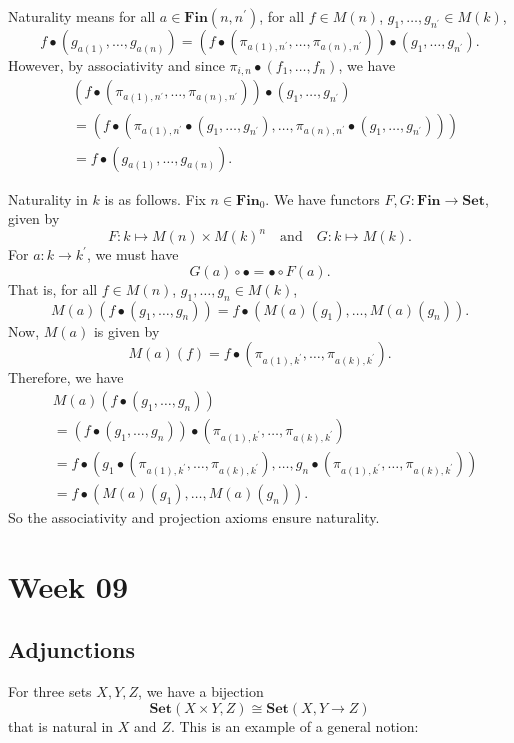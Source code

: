 \documentclass{amsbook}
\newcommand{\Catb}[1]{\mathbf{#1}}
\newcommand{\SET}{\Catb{Set}}
\newcommand{\FIN}{\Catb{Fin}}
\newcommand{\Ob}[1]{{#1}_0}
\newcommand{\Hom}[3]{{#1}\left(#2,#3\right)}
\theoremstyle{definition}
\begin{document}
  Naturality means for all $ a \in \Hom{\FIN}{n}{n^\prime} $, for all $ f \in M(n) $, $ g_1, \dots, g_{n^\prime} \in M(k) $,
  \[ f \bullet (g_{a(1)}, \dots, g_{a(n)}) = (f \bullet (\pi_{a(1), n^\prime}, \dots, \pi_{a(n), n^\prime})) \bullet (g_1, \dots, g_{n^\prime}). \]
  However, by associativity and since $ \pi_{i, n} \bullet (f_1, \dots, f_n) $, we have
  \begin{align*}
    & (f \bullet (\pi_{a(1), n^\prime}, \dots, \pi_{a(n), n^\prime})) \bullet (g_1, \dots, g_{n^\prime})\\
    &= (f \bullet (\pi_{a(1), n^\prime} \bullet (g_1, \dots, g_{n^\prime}), \dots, \pi_{a(n), n^\prime} \bullet (g_1, \dots, g_{n^\prime})))\\
    &= f \bullet (g_{a(1)}, \dots, g_{a(n)}).
  \end{align*}

  Naturality in $ k $ is as follows. Fix $ n \in \Ob \FIN $. We have functors $ F, G: \FIN \to \SET $, given by
  \[ F: k \mapsto M(n) \times M(k)^n \quad \text{and} \quad G: k \mapsto M(k). \]
  For $ a: k \to k^\prime $, we must have
  \[ G(a) \circ \bullet = \bullet \circ F(a). \]
  That is, for all $ f \in M(n) $, $ g_1, \dots, g_n \in M(k) $,
  \[ M(a) (f \bullet (g_1, \dots, g_n)) = f \bullet (M(a)(g_1), \dots, M(a)(g_n)). \]
  Now, $ M(a) $ is given by
  \[ M(a)(f) = f \bullet (\pi_{a(1), k^\prime}, \dots, \pi_{a(k), k^\prime}). \]
  Therefore, we have
  \begin{align*}
    & M(a) (f \bullet (g_1, \dots, g_n))\\
    &= (f \bullet (g_1, \dots, g_n)) \bullet (\pi_{a(1), k^\prime}, \dots, \pi_{a(k), k^\prime})\\
    &= f \bullet (g_1 \bullet (\pi_{a(1), k^\prime}, \dots, \pi_{a(k), k^\prime}), \dots, g_n \bullet (\pi_{a(1), k^\prime}, \dots, \pi_{a(k), k^\prime}))\\
    &= f \bullet (M(a)(g_1), \dots, M(a)(g_n)).
  \end{align*}
  So the associativity and projection axioms ensure naturality.

  \chapter*{Week 09}

  \section{Adjunctions}
  For three sets $ X, Y, Z $, we have a bijection
  \[ \Hom \SET {X \times Y} Z \cong \Hom \SET X {Y \to Z} \]
  that is natural in $ X $ and $ Z $. This is an example of a general notion:
\end{document}
